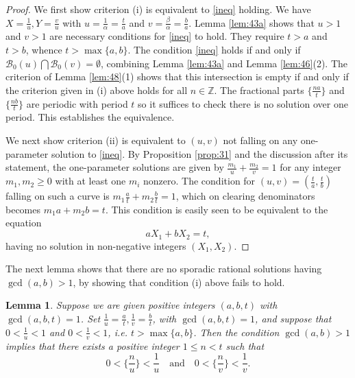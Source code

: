\documentclass[12pt,letterpaper, reqno]{amsart}
\newtheorem{lem}[thm]{Lemma}
\theoremstyle{definition}
\theoremstyle{remark}
\newcommand{\ZZ}{\ensuremath{\mathbb{Z}}}
\newcommand{\sB}{{\mathcal B}}
\begin{document}
\begin{proof}

We first show criterion (i) is equivalent to \eqref{ineq} holding. 
We have $X = \frac{1}{u}, Y= \frac{v}{u}$ with $u = \frac{1}{\alpha}= \frac{t}{a}$ and $v= \frac{\beta}{\alpha}= \frac{b}{a}$.
Lemma \ref{lem:43a} shows that  $u>1$ and $v>1$ are necessary conditions for \eqref{ineq} to hold.
They require $t >a$ and $t>b$, whence  $t > \max \{ a, b\}.$
The condition \eqref{ineq} holds  if and only if
$\sB_0(u) \bigcap \sB_0(v) = \emptyset$, combining Lemma \ref{lem:43a} and Lemma \ref{lem:46}(2).
The criterion of Lemma \ref{lem:48}(1) shows that this intersection is empty if 
and only if the criterion given in (i) above holds for all $n \in \ZZ$. The fractional parts 
$\{ \frac{na}{t}\} $ and $\{ \frac{nb}{t}\}$ are periodic with period $t$ so it suffices to check there is no solution over one period.
This establishes the equivalence. 
 


We next show criterion (ii) is equivalent to $(u, v)$ not falling on any one-parameter solution to \eqref{ineq}.
By Proposition \ref{prop:31} and the discussion after its statement,
the  one-parameter solutions are  given by $\frac{m_1}{u} + \frac{m_2}{v} =1$
for any integer $m_1, m_2 \ge 0$ with at least one $m_i$ nonzero.  The condition for $(u, v) = (\frac{t}{a}, \frac{t}{b})$ 
 falling on such a curve 
is  $m_1 \frac{a}{t}  + m_2 \frac{b}{t}= 1$, which on clearing denominators becomes 
 $m_1 a + m_2 b= t$. This condition is easily seen to be equivalent to the equation 
$$
aX_1 + bX_2 = t,
$$
having no solution in non-negative integers $(X_1, X_2)$.
\end{proof}






The next lemma shows that there are no sporadic rational solutions having
$\gcd(a, b) >1$, by showing that condition (i) above   fails to hold.



\begin{lem}\label{lem:415}
Suppose we are given  positive integers $(a, b, t)$ with $\gcd (a,b, t) =1$. 
Set  $\frac{1}{u} = \frac{a}{t}, \frac{1}{v} = \frac{b}{t}$, with $\gcd(a, b, t)=1$, and  suppose
that $0< \frac{1}{u}<1$ and $0< \frac{1}{v} < 1$, i.e. $t > \max\{a, b\}$.
Then the condition $\gcd(a, b) >1$ implies that there exists a positive integer $1 \le n< t$ such that
$$
0 <  \{ \frac{n}{u}\} < \frac{1}{u}  \quad \mbox{and} \quad 0 < \{ \frac{n}{v}\} < \frac{1}{v}.
$$
 \end{lem}
\end{document}
